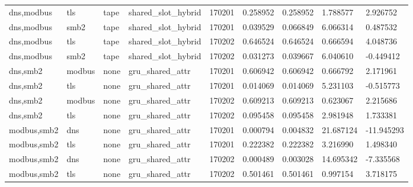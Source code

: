 \begin{tabular}{lllllllll}
dns,modbus & tls & tape & shared\_slot\_hybrid & 170201 & 0.258952 & 0.258952 & 1.788577 & 2.926752 \\
dns,modbus & smb2 & tape & shared\_slot\_hybrid & 170201 & 0.039529 & 0.066849 & 6.066314 & 0.487532 \\
dns,modbus & tls & tape & shared\_slot\_hybrid & 170202 & 0.646524 & 0.646524 & 0.666594 & 4.048736 \\
dns,modbus & smb2 & tape & shared\_slot\_hybrid & 170202 & 0.031273 & 0.039667 & 6.040610 & -0.449412 \\
dns,smb2 & modbus & none & gru\_shared\_attr & 170201 & 0.606942 & 0.606942 & 0.666792 & 2.171961 \\
dns,smb2 & tls & none & gru\_shared\_attr & 170201 & 0.014069 & 0.014069 & 5.231103 & -0.515773 \\
dns,smb2 & modbus & none & gru\_shared\_attr & 170202 & 0.609213 & 0.609213 & 0.623067 & 2.215686 \\
dns,smb2 & tls & none & gru\_shared\_attr & 170202 & 0.095458 & 0.095458 & 2.981948 & 1.733381 \\
modbus,smb2 & dns & none & gru\_shared\_attr & 170201 & 0.000794 & 0.004832 & 21.687124 & -11.945293 \\
modbus,smb2 & tls & none & gru\_shared\_attr & 170201 & 0.222382 & 0.222382 & 3.216990 & 1.498340 \\
modbus,smb2 & dns & none & gru\_shared\_attr & 170202 & 0.000489 & 0.003028 & 14.695342 & -7.335568 \\
modbus,smb2 & tls & none & gru\_shared\_attr & 170202 & 0.501461 & 0.501461 & 0.997154 & 3.718175 \\
\hline
\end{tabular}
